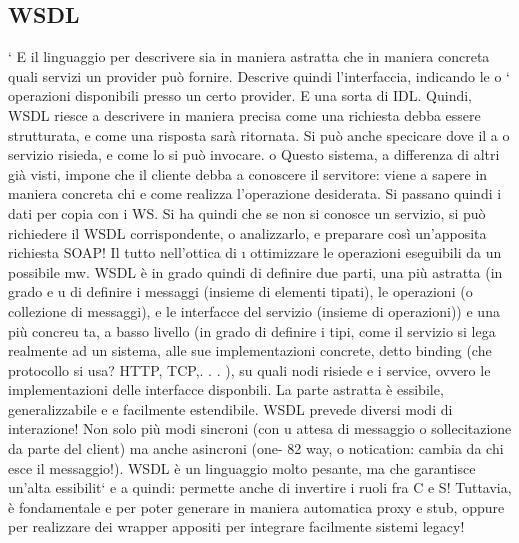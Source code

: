 \documentclass[a4paper,12pt]{article}
\begin{document}
\subsection{WSDL}
`
E il linguaggio per descrivere sia in maniera astratta che in maniera concreta
quali servizi un provider può fornire. Descrive quindi l'interfaccia, indicando le
o
`
operazioni disponibili presso un certo provider. E una sorta di IDL. Quindi,
WSDL riesce a descrivere in maniera precisa come una richiesta debba essere
strutturata, e come una risposta sarà ritornata. Si può anche specicare dove il
a
o
servizio risieda, e come lo si può invocare.
o
Questo sistema, a differenza di altri già visti, impone che il cliente debba
a
conoscere il servitore: viene a sapere in maniera concreta chi e come realizza
l'operazione desiderata. Si passano quindi i dati per copia con i WS. Si ha quindi che se non si conosce un servizio, si
può richiedere il WSDL corrispondente,
o
analizzarlo, e preparare così un'apposita richiesta SOAP! Il tutto nell'ottica di
\i{}
ottimizzare le operazioni eseguibili da un possibile mw.
WSDL è in grado quindi di definire due parti, una più astratta (in grado
e
u
di definire i messaggi (insieme di elementi tipati), le operazioni (o collezione di
messaggi), e le interfacce del servizio (insieme di operazioni)) e una più concreu
ta, a basso livello (in grado di definire i tipi, come il servizio si lega realmente
ad un sistema, alle sue implementazioni concrete, detto binding (che protocollo
si usa? HTTP, TCP,. . . ), su quali nodi risiede e i service, ovvero le implementazioni delle interfacce disponbili. La
parte astratta è essibile, generalizzabile
e
e facilmente estendibile.
WSDL prevede diversi modi di interazione! Non solo più modi sincroni (con
u
attesa di messaggio o sollecitazione da parte del client) ma anche asincroni (one-
82
way, o notication: cambia da chi esce il messaggio!).
WSDL è un linguaggio molto pesante, ma che garantisce un'alta essibilit`
e
a
quindi: permette anche di invertire i ruoli fra C e S! Tuttavia, è fondamentale
e
per poter generare in maniera automatica proxy e stub, oppure per realizzare
dei wrapper appositi per integrare facilmente sistemi legacy!
\end{document}
